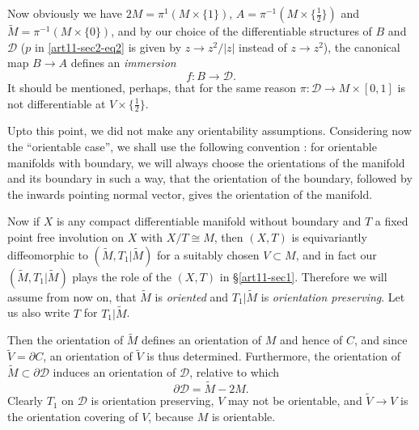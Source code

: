 Now obviously we have $2M=\pi^{1}(M\times \{1\})$, $A=\pi^{-1}(M\times \{\frac{1}{2}\})$ and $\widetilde{M}=\pi^{-1}(M\times \{0\})$, and by our choice of the differentiable structures of $B$ and $\mathscr{D}$ ($p$ in \eqref{art11-sec2-eq2} is given by $z\to z^{2}/|z|$ instead of $z\to z^{2}$), the canonical map $B\to A$ defines an {\em immersion}
$$
f:B\to \mathscr{D}.
$$
It should be mentioned, perhaps, that for the same reason $\pi:\mathscr{D}\to M\times [0,1]$ is not differentiable at $V\times \{\frac{1}{2}\}$.

Up\pageoriginale to this point, we did not make any orientability assumptions. Considering now the ``orientable case'', we shall use the following convention : for orientable manifolds with boundary, we will always choose the orientations of the manifold and its boundary in such a way, that the orientation of the boundary, followed by the inwards pointing normal vector, gives the orientation of the manifold.

Now if $X$ is any compact differentiable manifold without boundary and $T$ a fixed point free involution on $X$ with $X/T\cong M$, then $(X,T)$ is equivariantly diffeomorphic to $(\widetilde{M},T_{1}|\widetilde{M})$ for a suitably chosen $V\subset M$, and in fact our $(\widetilde{M},T_{1}|\widetilde{M})$ plays the role of the $(X,T)$ in \S\ref{art11-sec1}. Therefore we will assume from now on, that $\widetilde{M}$ is {\em oriented} and $T_{1}|\widetilde{M}$ is {\em orientation preserving}. Let us also write $T$ for $T_{1}|\widetilde{M}$.

Then the orientation of $\widetilde{M}$ defines an orientation of $M$ and hence of $C$, and since $\widetilde{V}=\partial C$, an orientation of $\widetilde{V}$ is thus determined. Furthermore, the orientation of $\widetilde{M}\subset\partial \mathscr{D}$ induces an orientation of $\mathscr{D}$, relative to which
\begin{equation}
\partial \mathscr{D}=\widetilde{M}-2M.\label{art11-sec2-eq4}
\end{equation}
Clearly $T_{1}$ on $\mathscr{D}$ is orientation preserving, $V$ may not be orientable, and $\widetilde{V}\to V$ is the orientation covering of $V$, because $M$ is orientable.

